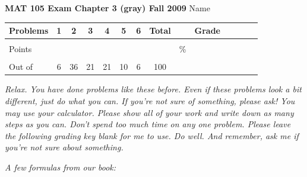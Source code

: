 \documentclass[12pt]{article}
\begin{document}
{\bf MAT 105 Exam Chapter 3 (gray) Fall 2009} \hspace{.4in} {\large Name} \hrulefill

\hrulefill


\begin{center}

\begin{tabular}
{|l|c|c|c|c|c|c|c|c|c|c|c|c|c|} \hline

 Problems & \hspace{5 pt} 1 \hspace{5 pt}  & \hspace{5 pt} 2 \hspace{5 pt} & \hspace{5 pt} 3 \hspace{5 pt} & \hspace{5 pt} 4 \hspace{5 pt} & \hspace{5 pt} 5 \hspace{5 pt} &  \hspace{5 pt} 6 \hspace{5 pt} &  \hspace{5 pt} Total  \hspace{5 pt} & &  \hspace{5 pt} Grade \hspace{5 pt}  \\ \hline
&&&&&&& &&\\  
Points &&&&&&& &    \hspace{.8in}\% &  \\ 
&&&&&& &&& \\  \hline
Out of & 6 & 36  & 21 & 21 & 10 & 6 &100 & & \\ \hline

\end {tabular}
 
\end{center}

 \emph{Relax.  You have done problems like these before.  Even if these problems look a bit different, just do what you can.  If you're not sure of something, please ask! You may use your calculator.  Please show all of your work and write down as many steps as you can.  Don't spend too much time on any one problem.  Please leave the following grading key blank for me to use.  Do well.  And remember, ask me if you're not sure about something.}
 
 \vspace{.1 in}
 
 \emph{A few formulas from our book:}
  \vspace{.2in}
 
\end{document}
